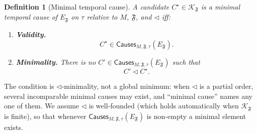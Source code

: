 \documentclass[11pt]{article}
\newtheorem{definition}{Definition}
\theoremstyle{remark}
\newcommand{\Frame}{\mathfrak{F}}
\begin{document}
\begin{definition}[Minimal temporal cause]
\label{def:mincause}
A candidate \(C^\star\in\mathcal{K}_{\Frame}\) is a minimal temporal
cause of \(E_{\Frame}\) on \(\tau\) relative to \(M\), \(\Frame\), and
\(\triangleleft\) iff:
\begin{enumerate}[label=\arabic*.]
  \item \textbf{Validity.}
        \[
          C^\star\in
          \mathsf{Causes}_{M,\Frame,\tau}(E_{\Frame}).
        \]
  \item \textbf{Minimality.} There is no
        \(C'\in\mathsf{Causes}_{M,\Frame,\tau}(E_{\Frame})\) such that
        \[
          C'\triangleleft C^\star .
        \]
\end{enumerate}
\end{definition}

The condition is \(\triangleleft\)-minimality, not a global minimum: when
\(\triangleleft\) is a partial order, several incomparable minimal causes may
exist, and ``minimal cause'' names any one of them. We assume
\(\triangleleft\) is well-founded (which holds automatically when
\(\mathcal{K}_{\Frame}\) is finite), so that whenever
\(\mathsf{Causes}_{M,\Frame,\tau}(E_{\Frame})\) is non-empty a minimal element
exists.
\end{document}
